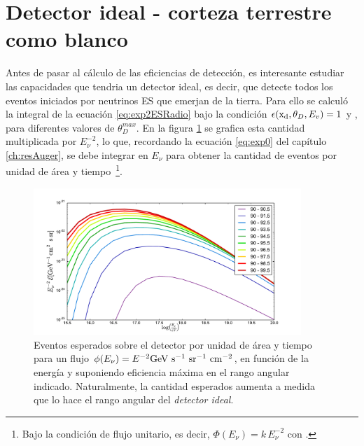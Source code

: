 \section{Detector ideal - corteza terrestre como blanco}
\label{sc:idealRadio}
	Antes de pasar al c\'alculo de las eficiencias de detecci\'on, es interesante estudiar las capacidades que tendria un detector ideal, es decir, que detecte todos los eventos iniciados por neutrinos ES que emerjan de la tierra.
	Para ello se calcul\'o la integral de la ecuaci\'on \ref{eq:exp2ESRadio} bajo la condici\'on $\epsilon ({\rm x_d},\theta_D,E_v) = 1$ y , para diferentes valores de $\theta_D^{max}$.
	En la figura \ref{fig:exposuresFluxThetas} se grafica esta cantidad multiplicada por $E_\nu^{-2}$, lo que, recordando la ecuaci\'on \ref{eq:exp0} del cap\'itulo \ref{ch:resAuger}, se debe integrar en $E_\nu$ para obtener la cantidad de eventos por unidad de \'area y tiempo~\footnote{Bajo la condici\'on de flujo unitario, es decir, $\Phi(E_{\nu})=k\,E_\nu^{-2}$ con .}.
%
	\begin{figure}[h!]
		\begin{center}
			\includegraphics[width=0.9\textwidth]{fig/resultadosRadio/exposureFullEff_thetas}
			\caption{\label{fig:exposuresFluxThetas} Eventos esperados sobre el detector por unidad de \'area y tiempo para un flujo $\phi(E_\nu)= E^{-2}{\rm GeV\ s^{-1}\ sr^{-1}\ cm^{-2}}$, en funci\'on de la energ\'ia y suponiendo eficiencia m\'axima en el rango angular indicado.
			Naturalmente, la cantidad esperados aumenta a medida que lo hace el rango angular del \emph{detector ideal}.
			}
		\end{center}
	\end{figure}
	
